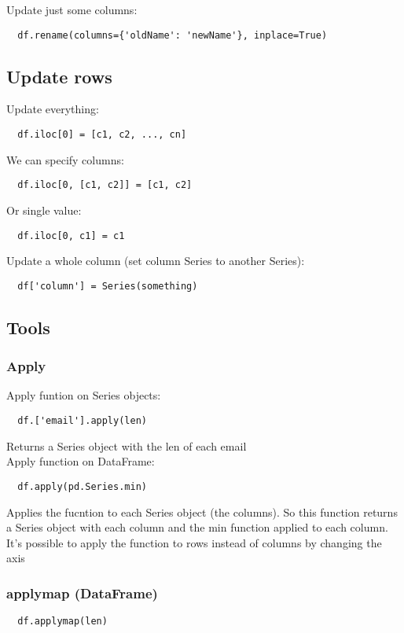 \documentclass[french]{article}
\begin{document}
Update just some columns:
\begin{lstlisting}
  df.rename(columns={'oldName': 'newName'}, inplace=True)
\end{lstlisting}

\subsection{Update rows}

Update everything:
\begin{lstlisting}
  df.iloc[0] = [c1, c2, ..., cn]
\end{lstlisting}

We can specify columns:
\begin{lstlisting}
  df.iloc[0, [c1, c2]] = [c1, c2]
\end{lstlisting}

Or single value:
\begin{lstlisting}
  df.iloc[0, c1] = c1
\end{lstlisting}

Update a whole column (set column Series to another Series):
\begin{lstlisting}
  df['column'] = Series(something)
\end{lstlisting}

\subsection{Tools}
\subsubsection{Apply}

Apply funtion on Series objects:
\begin{lstlisting}
  df.['email'].apply(len)
\end{lstlisting}
Returns a Series object with the len of each email\\

Apply function on DataFrame:
\begin{lstlisting}
  df.apply(pd.Series.min)
\end{lstlisting}
Applies the fucntion to each Series object (the columns). So this function returns a Series object with each column and the min function applied to each column.\\

It's possible to apply the function to rows instead of columns by changing the axis

\subsubsection{applymap (DataFrame)}
\begin{lstlisting}
  df.applymap(len)
\end{lstlisting}
\end{document}
